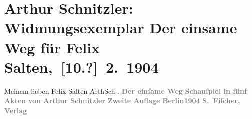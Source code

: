 

         
         \renewcommand{\erwaehntePersonen}{Personen: Felix Salten}
         \renewcommand{\erwaehnteInstitutionen}{Institutionen: S. Fischer Verlag}
         \renewcommand{\erwaehnteOrte}{Orte: Berlin, Wien}
         \renewcommand{\erwaehnteWerke}{Werke: Der einsame Weg. Schauspiel in fünf Akten}
               \section[ Arthur Schnitzler: Widmungsexemplar Der einsame Weg für Felix Salten, {[}10.?{]} 2. 1904]{ Arthur Schnitzler: Widmungsexemplar Der einsame Weg für Felix
               Salten, {[}10.?{]} 2. 1904}\nopagebreak{}\rehead{ }\begin{ledgroupsized}[t]{13cm}\normalsize\beginnumbering{} \toendnotes[C]{\smallbreak\pagebreak[2]} 
\toendnotes[C]{\smallbreak}\pstart
           \noindent{}{\pb}Meinem lieben Felix Salten\pend
           \pstart \spacefill\mbox{ArthSch}\pend{}\pstart
           \label{K_L03604-1v}\label{K_L03604-1h}.\pend
           {\bigskip}\pstart
           \noindent{}\centering{}{\pb}\textcolor{gray}{\textbf{\textbf{Der einſame Weg}}}\pend
           \pstart
           \noindent{}\centering{}\textcolor{gray}{\textbf{Schauſpiel in fünf Akten}}\pend
           \pstart
           \noindent{}\centering{}\textcolor{gray}{\textbf{von}}\pend
           \pstart
           \noindent{}\centering{}\textcolor{gray}{\textbf{\textbf{Arthur Schnitzler}}}\pend
           {\bigskip}\pstart
           \noindent{}\centering{}\textcolor{gray}{\textbf{Zweite Auflage}}\pend
           {\bigskip}\pstart
           \noindent{}\centering{}\textcolor{gray}{\textbf{Berlin1904}}\pend
           \pstart
           \noindent{}\centering{}\textcolor{gray}{\textbf{S. Fiſcher, Verlag}}\pend
           
         
         \endnumbering{}\end{ledgroupsized}  \newcommand{\dateiname}{L03604}\newcommand{\titel}{Arthur Schnitzler: Widmungsexemplar Der einsame Weg für Felix Salten, [10.?] 2. 1904}\newcommand{\editorInnen}{Martin Anton Müller und Laura Untner}
      